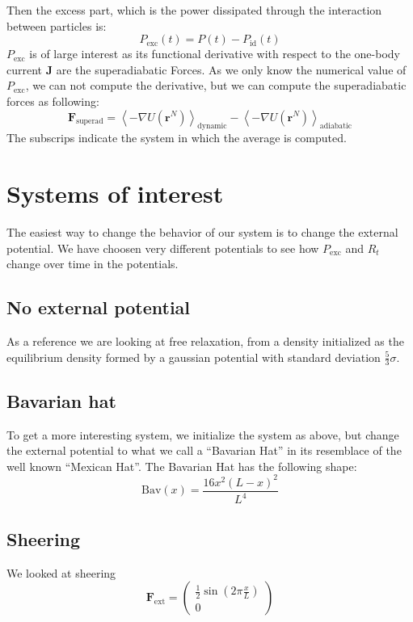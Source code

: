 \documentclass[a4paper]{article}
\renewcommand\vec[1]{\mathbf{#1}}
\begin{document}
Then the excess part, which is the power dissipated through the interaction between particles is:
\begin{equation}
	P_\mathrm{exc}(t)=P(t)- P_\mathrm{id}(t) 
	\label{eq:dissipationexess}
\end{equation}
$P_\mathrm{exc}$ is of large interest as its functional derivative with respect to the one-body current $\vec{J}$ are the superadiabatic Forces. As we only know the numerical value of $P_\mathrm{exc}$, we can not compute the derivative, but we can compute the superadiabatic forces as following:
\begin{equation}
	\vec{F}_\mathrm{superad}=\left \langle -\nabla U \left( \vec{r}^N \right) \right \rangle_\mathrm{dynamic}-\left \langle -\nabla U \left( \vec{r}^N \right) \right \rangle_\mathrm{adiabatic}
	\label{eq:superad}
\end{equation}
The subscrips indicate the system in which the average is computed.

\section{Systems of interest}
The  easiest way to change the behavior of our system is to change the external potential. We have choosen very different potentials to see how $P_\mathrm{exc}$ and $R_t$ change over time in the  potentials.

\subsection{No external potential}
As a reference we are looking at free relaxation, from a density initialized as the equilibrium density formed by a gaussian potential with standard deviation $\frac{5}{3}\sigma$.
\subsection{Bavarian hat}
To get a more interesting system, we initialize the system as above, but change the external potential to what we call a ``Bavarian Hat'' in its resemblace of the well known ``Mexican Hat''. The Bavarian Hat has the following shape:
\begin{equation}
	\mathrm{Bav}(x)=\frac{16 x^2\left( L-x \right)^2}{L^4}
	\label{eq:bavarian}
\end{equation}
\subsection{Sheering}
We looked at sheering 
\begin{equation}
	\vec{F}_\mathrm{ext}=\begin{pmatrix}\frac{1}{2}\sin\left( {2\pi\frac{x}{L}} \right) \\ 0 \end{pmatrix}
	\label{eq:sheer}
\end{equation}
\end{document}
